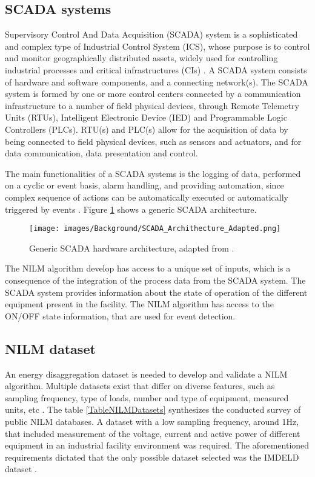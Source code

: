 \subsection{SCADA systems}
Supervisory Control And Data Acquisition (SCADA) system is a sophisticated and complex type of Industrial Control System (ICS), whose purpose is to control and monitor geographically distributed assets, widely used for controlling industrial processes and critical infrastructures (CIs) \cite{SCADA_Architecture_Security}.
A SCADA system consists of hardware and software components, and a connecting network(s). The SCADA system is formed by one or more control centers connected by a communication infrastructure to a number of field physical devices, through Remote Telemetry Units (RTUs), Intelligent Electronic Device (IED) and Programmable Logic Controllers (PLCs). 
RTU(s) and PLC(s) allow for the acquisition of data  by being connected to field physical devices, such as sensors and actuators, and for data communication, data presentation and control.

The main functionalities of a SCADA systems is the logging of data, performed on a cyclic or event basis, alarm handling, and providing automation, since complex sequence of actions can be automatically executed or automatically triggered by events \cite{Whats_is_SCADA}. Figure \ref{fig: Scada_architecture} shows a generic SCADA architecture.

\begin{figure}[H]
    \centering
    \texttt{[image: images/Background/SCADA\_Archithecture\_Adapted.png]}
    \caption{ Generic SCADA hardware architecture, adapted from \cite{SCADA_CyberSecurity}. }
    \label{fig: Scada_architecture}
\end{figure}

The NILM algorithm develop has access to a unique set of inputs, which is a consequence of the integration of the process data from the SCADA system. The SCADA system provides information about the state of operation of the different equipment present in the facility. The NILM algorithm has access to the ON/OFF state information, that are used for event detection. 




\subsection{NILM dataset}
An energy disaggregation dataset is needed to develop and validate a NILM algorithm. Multiple datasets exist that differ on diverse features, such as sampling frequency, type of loads, number and type of equipment, measured units, etc \cite{NILM_Datasets}. The table \ref{TableNILMDatasets} synthesizes the conducted survey of public NILM databases.
A dataset with a low sampling frequency, around 1Hz, that included measurement of the voltage, current and active power of different equipment in an industrial facility environment was required. The aforementioned requirements dictated that the only possible dataset selected was the IMDELD dataset \cite{IMDELD}.


